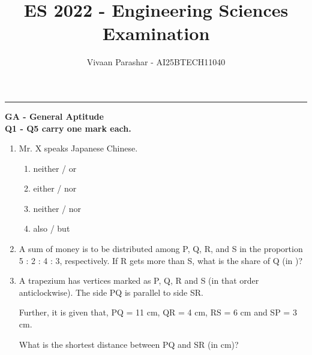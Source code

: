 \documentclass[12pt,a4paper]{article}
\title{\textbf{ES 2022 - Engineering Sciences Examination}}
\author{Vivaan Parashar - AI25BTECH11040}
\begin{document}
\maketitle

\hrule
\vspace{0.5cm}

\noindent\LARGE\textbf{GA - General Aptitude}\\
\normalsize\textbf{Q1 - Q5 carry one mark each.}
\begin{enumerate}
   \item Mr. X speaks \underline{\hspace{2cm}} Japanese \underline{\hspace{2cm}} Chinese.
         \begin{enumerate}
            \item neither / or
            \item either / nor
            \item neither / nor
            \item also / but
         \end{enumerate}

   \item A sum of money is to be distributed among P, Q, R, and S in the proportion 5 : 2 : 4 : 3, respectively. If R gets  more than S, what is the share of Q (in \rupee)?
         \begin{enumerate}
         \end{enumerate}

   \item A trapezium has vertices marked as P, Q, R and S (in that order anticlockwise). The side PQ is parallel to side SR.

         Further, it is given that, PQ = 11 cm, QR = 4 cm, RS = 6 cm and SP = 3 cm.

         What is the shortest distance between PQ and SR (in cm)?
         \begin{enumerate}
         \end{enumerate}


\end{enumerate}
\end{document}
